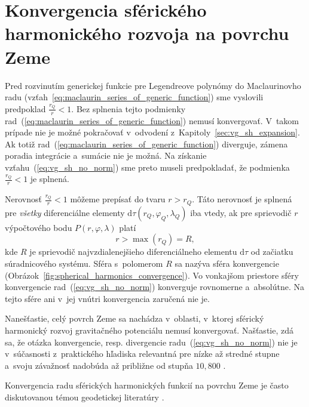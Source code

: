 \documentclass[a4paper,12pt]{book}
\newcommand{\diff}{\mathrm d}
\begin{document}

\section{Konvergencia sférického harmonického rozvoja na povrchu Zeme}
\label{sec:convergence_of_spherical_harmonics}

Pred rozvinutím generickej funkcie pre Legendreove polynómy do Maclaurinovho 
radu (vzťah~\ref{eq:maclaurin_series_of_generic_function}) sme vyslovili 
predpoklad $\frac{r_Q}{r} < 1$.  Bez splnenia tejto podmienky 
rad~(\ref{eq:maclaurin_series_of_generic_function}) nemusí konvergovať.  
V~takom prípade nie je možné pokračovať v~odvodení 
z~Kapitoly~\ref{sec:vg_sh_expansion}.  Ak totiž 
rad~(\ref{eq:maclaurin_series_of_generic_function}) diverguje, zámena poradia 
integrácie a~sumácie nie je možná.  Na získanie vzťahu~(\ref{eq:vg_sh_no_norm}) 
sme preto museli predpokladať, že podmienka $\frac{r_Q}{r} < 1$ je splnená.

Nerovnosť $\frac{r_Q}{r} < 1$ môžeme prepísať do tvaru $r > r_Q$.  Táto
nerovnosť je splnená pre \emph{všetky} diferenciálne elementy $\diff \tau(r_Q,
\varphi_Q, \lambda_Q)$ iba vtedy, ak pre sprievodič $r$ výpočtového bodu $P(r,
\varphi, \lambda)$ platí
%
\begin{equation}
\label{eq:spherical_harmonic_convergence}
r > \max(r_Q) = R{,}
\end{equation}
%
kde $R$ je sprievodič najvzdialenejšieho diferenciálneho elementu $\diff\tau$ 
od začiatku súradnicového systému.  Sféra s~polomerom $R$ sa nazýva sféra 
konvergencie \parencite{Hotine} 
(Obrázok~\ref{fig:spherical_harmonics_convergence}).  Vo vonkajšom priestore 
sféry konvergencie rad~(\ref{eq:vg_sh_no_norm}) konverguje rovnomerne 
a~absolútne.  Na tejto sfére ani v~jej vnútri konvergencia zaručená nie je.

Nanešťastie, celý povrch Zeme sa nachádza v~oblasti, v~ktorej sférický 
harmonický rozvoj gravitačného potenciálu nemusí konvergovať.  Našťastie, zdá 
sa, že otázka konvergencie, resp. divergencie radu~(\ref{eq:vg_sh_no_norm}) nie 
je v~súčasnosti z~praktického hľadiska relevantná pre nízke až stredné stupne 
a~svoju závažnosť nadobúda až približne od stupňa $10{,}800$ 
\parencite{Hirt2016,Rexer2017}.

Konvergencia radu sférických harmonických funkcií na povrchu Zeme je často 
diskutovanou témou geodetickej literatúry 
\parencite{Hotine,Krarup1969,MoritzAdvancedGeodesy,Sjoberg1980,Jekeli1983,SansoGeoidDetermination}.
\end{document}
